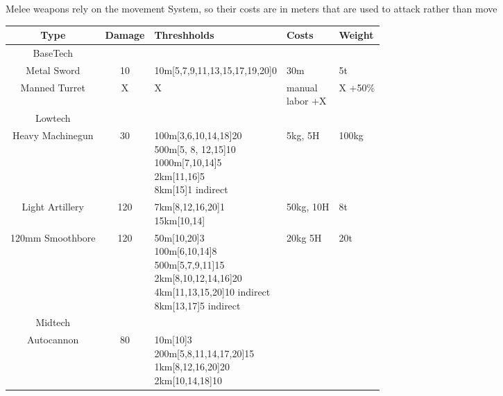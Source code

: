 Melee weapons rely on the movement System, so their costs are in meters that are used to attack rather than move\par
\begin{tabular}{c|clll}
    Type & Damage & Threshholds & Costs & Weight\\
    \hline \hline BaseTech&&&&\\
    \hline
    Metal Sword & 10 & 10m[5,7,9,11,13,15,17,19,20]0 & 30m & 5t \\
    \hline
    Manned Turret & X & X & \makecell[l]{manual \\labor +X} &  X +50\% \\
    \hline \hline Lowtech &&&&\\
    \hline
    Heavy Machinegun & 30 & \makecell[l]{100m[3,6,10,14,18]20\\
                                        500m[5, 8, 12,15]10\\
                                        1000m[7,10,14]5\\
                                        2km[11,16]5\\
                                        8km[15]1 indirect}& 5kg, 5H & 100kg \\
    \hline
    Light Artillery & 120 & \makecell[l]{7km[8,12,16,20]1 \\
                                        15km[10,14]}& 50kg, 10H & 8t  \\
    \hline
    120mm Smoothbore & 120 & \makecell[l]{50m[10,20]3\\
                                        100m[6,10,14]8\\
                                        500m[5,7,9,11]15\\
                                        2km[8,10,12,14,16]20\\
                                        4km[11,13,15,20]10 indirect\\
                                        8km[13,17]5 indirect}
                                            & 20kg 5H & 20t \\
    \hline\hline Midtech &&&&\\
    \hline
    Autocannon & 80 & \makecell[l]{10m[10]3\\
                                  200m[5,8,11,14,17,20]15\\
                                  1km[8,12,16,20]20\\
                                  2km[10,14,18]10 \\
}
\end{tabular}
